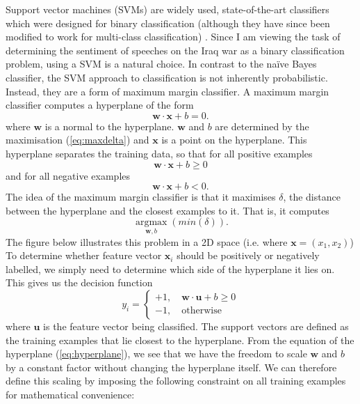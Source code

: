 \documentclass[12pt,a4paper,twoside,openright]{report}
\begin{document}
Support vector machines (SVMs) are widely used, state-of-the-art classifiers which were designed for binary classification (although they have since been modified to work for multi-class classification) \cite{ml_book}. Since I am viewing the task of determining the sentiment of speeches on the Iraq war as a binary classification problem, using a SVM is a natural choice.
\newline
\newline
In contrast to the na\"{i}ve Bayes classifier, the SVM approach to classification is not inherently probabilistic. Instead, they are a form of maximum margin classifier. A maximum margin classifier computes a hyperplane of the form
\begin{equation} \label{eq:hyperplane}
	\mathbf{w} \cdot \mathbf{x} + b = 0.
\end{equation}
where $\mathbf{w}$ is a normal to the hyperplane. $\mathbf{w}$ and $b$ are determined by the maximisation (\ref{eq:maxdelta}) and $\mathbf{x}$ is a point on the hyperplane. This hyperplane separates the training data, so that for all positive examples
\begin{equation}
\mathbf{w} \cdot \mathbf{x} + b \ge 0
\end{equation}
and for all negative examples
\begin{equation}
\mathbf{w} \cdot \mathbf{x} + b < 0.
\end{equation}
The idea of the maximum margin classifier is that it maximises $\delta$, the distance between the hyperplane and the closest examples to it. That is, it computes
\begin{equation} \label{eq:maxdelta}
	\underset{\mathbf{w}, b}{\operatorname{argmax}}(min(\delta)).
\end{equation}
The figure below illustrates this problem in a 2D space (i.e. where $\mathbf{x} = (x_1, x_2)$)
\newline
\newline
To determine whether feature vector $\mathbf{x}_i$ should be positively or negatively labelled, we simply need to determine which side of the hyperplane it lies on. This gives us the decision function
\begin{equation} \label{eq:initialdecision}
	y_i =
	\begin{cases}
		+1, \quad \mathbf{w} \cdot \mathbf{u} + b \ge 0 \\
		-1, \quad \text{otherwise}
	\end{cases}
\end{equation}
where $\mathbf{u}$ is the feature vector being classified. The support vectors are defined as the training examples that lie closest to the hyperplane. From the equation of the hyperplane (\ref{eq:hyperplane}), we see that we have the freedom to scale $\mathbf{w}$ and $b$ by a constant factor without changing the hyperplane itself. We can therefore define this scaling by imposing the following constraint on all training examples for mathematical convenience:
\end{document}
